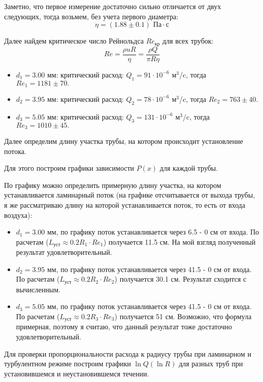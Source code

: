 \documentclass[a4paper, 12pt]{article}
\begin{document}
	Заметно, что первое измерение достаточно сильно отличается от двух следующих, тогда возьмем, без учета первого диаметра:
	\begin{equation*}
		\eta = (1.88\pm 0.1) \text{ Па}\cdot \text{с}
	\end{equation*} 
	
	Далее найдем критическое число Рейнольдса $Re_\text{кр}$ для всех трубок:
	\begin{equation*}
		Re = \frac{\rho u R}{\eta} = \frac{\rho Q}{\pi R \eta}
	\end{equation*}
	\begin{itemize}
		\item $d_1 = 3.00$ мм: критический расход: $Q_1 = 91\cdot10^{-6}\text{ м}^3$/c, тогда $Re_1 = 1181 \pm 70.$
		\item $d_2 = 3.95$ мм: критический расход: $Q_2 = 78\cdot10^{-6}\text{ м}^3$/c, тогда $Re_2 = 763 \pm 40.$  
		\item $d_3 = 5.05$ мм: критический расход: $Q_3 = 131\cdot10^{-6}\text{ м}^3$/c, тогда $Re_3 =  1010\pm 45.$ 
	\end{itemize}

	Далее определим длину участка трубы, на котором происходит установление потока.
	
	Для этого построим графики зависимости $P(x)$ для каждой трубы.
	
	По графику можно определить примерную длину участка, на котором устанавливается ламинарный поток (на графике отсчитывается от выхода трубы, я же рассматриваю длину на которой устанавливается поток, то есть от входа воздуха):
	\begin{itemize}
		\item $d_1 = 3.00$ мм, по графику поток устанавливается через 6.5 - 0 см от входа. По расчетам ($L_\text{уст} \approx 0.2R_1\cdot Re_1$)  получается 11.5 см. На мой взгляд полученный результат удовлетворительный.
		\item $d_2 = 3.95$ мм, по графику поток устанавливается через 41.5 - 0 см от входа. По расчетам ($L_\text{уст} \approx 0.2R_2\cdot Re_2$)  получается 30.1 см. Результат сходится с вычисленным.
		\item $d_3 = 5.05$ мм, по графику поток устанавливается через 41.5 - 0 см от входа. По расчетам ($L_\text{уст} \approx 0.2R_3\cdot Re_3$)  получается 51 см. Возможно, что формула примерная, поэтому я считаю, что данный результат тоже достаточно удовлетворительный.
	\end{itemize}

	Для проверки пропорциональности расхода к радиусу трубы при ламинарном и турбулентном режиме построим графики $\ln Q(\ln R)$ для разных труб при установившемся и неустановившемся течении.
	
\end{document}
